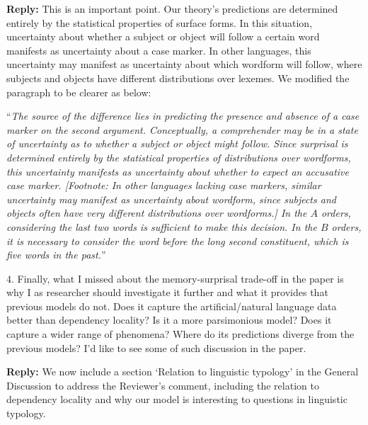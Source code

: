 \documentclass{article}[11pt,a4paper,oneside]
\newenvironment{reply}
  {\par\medskip
   \color{blue}%
   \begin{framed}
   \textbf{Reply: }\ignorespaces}
 {\end{framed}
  \medskip}
\begin{document}
\begin{reply}
	This is an important point. Our theory's predictions are determined entirely by the statistical properties of surface forms. In this situation, uncertainty about whether a subject or object will follow a certain word manifests as uncertainty about a case marker. In other languages, this uncertainty may manifest as uncertainty about which wordform will follow, where subjects and objects have different distributions over lexemes. We modified the paragraph to be clearer as below:
	
	``\textit{The source of the difference lies in predicting the presence and absence of a case marker on the second argument.
Conceptually, a comprehender may be in a state of uncertainty as to whether a subject or object might follow.
Since surprisal is determined entirely by the statistical properties of distributions over wordforms, this uncertainty manifests as uncertainty about whether to expect an accusative case marker.
[Footnote: In other languages lacking case markers, similar uncertainty may manifest as uncertainty about wordform, since subjects and objects often have very different distributions over wordforms.]
In the $A$ orders, considering the last two words is sufficient to make this decision.
	In the $B$ orders, it is necessary to consider the word before the long second constituent, which is five words in the past.}''
\end{reply}

4. Finally, what I missed about the memory-surprisal trade-off in the paper is why I as researcher should investigate it further and what it provides that previous models do not. Does it capture the artificial/natural language data better than dependency locality? Is it a more parsimonious model? Does it capture a wider range of phenomena? Where do its predictions diverge from the previous models? I'd like to see some of such discussion in the paper.

\begin{reply}
	We now include a section `Relation to linguistic typology' in the General Discussion to address the Reviewer's comment, including the relation to dependency locality and why our model is interesting to questions in linguistic typology.
\end{reply}
\end{document}
